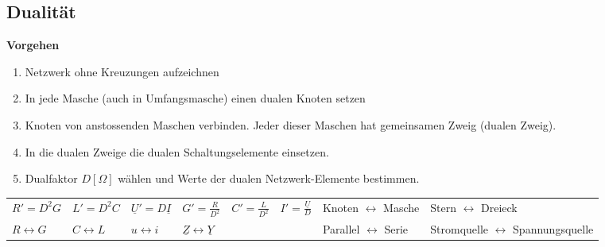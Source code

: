 			
\subsection{Dualität}
\textbf{Vorgehen}
\begin{enumerate}{\setlength{\itemsep}{0cm}\setlength{\parsep}{0cm} \setlength{\topsep}{0cm}}
	\item Netzwerk ohne Kreuzungen aufzeichnen
	\item In jede Masche (auch in Umfangsmasche) einen dualen Knoten setzen
	\item Knoten von anstossenden Maschen verbinden. Jeder dieser Maschen hat
	gemeinsamen Zweig (dualen Zweig).
	\item In die dualen Zweige die dualen Schaltungselemente einsetzen.
	\item Dualfaktor $D [\Omega]$ wählen und Werte der dualen Netzwerk-Elemente
	bestimmen.
\end{enumerate}

\begin{tabular}{llllllll}
$R'=D^2G$ & $L'=D^2C$ & $\underline{U}'=D\underline{I}$ & $G'=\frac{R}{D^2}$ &
$C'=\frac{L}{D^2}$ & $I'=\frac{\underline{U}}{D}$ & Knoten $\leftrightarrow$
Masche & Stern $\leftrightarrow$ Dreieck \\
$R \leftrightarrow G $ & $C \leftrightarrow L$ & $u \leftrightarrow i$ &
$\underline{Z} \leftrightarrow \underline{Y}$ & & & Parallel $\leftrightarrow$
Serie & Stromquelle $\leftrightarrow$ Spannungsquelle\\
\end{tabular}

